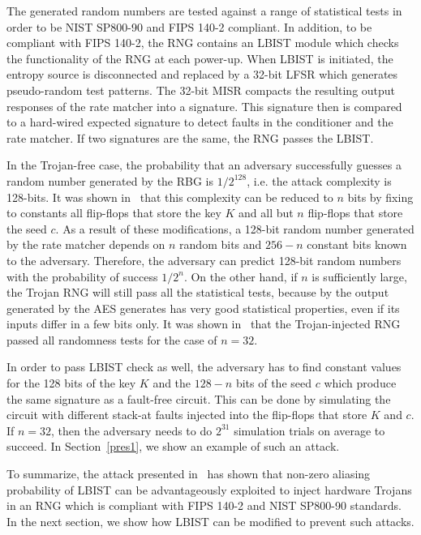 \documentclass[a4paper]{llncs}
\begin{document}
The generated random numbers are tested against a range of statistical tests in order to be NIST SP800-90 and FIPS 140-2 compliant.
In addition, to be compliant with FIPS 140-2, the RNG contains an LBIST module which checks the functionality of the RNG at each power-up. When LBIST is initiated, the entropy source is disconnected and replaced by a 32-bit LFSR which generates pseudo-random test patterns. The 32-bit MISR compacts the resulting output responses of the rate matcher into a signature.
This signature then is compared to a hard-wired expected signature to detect faults in the conditioner and the rate matcher. If two signatures are the same, the RNG passes the LBIST.



In the Trojan-free case, the probability that an adversary successfully guesses a random
number generated by the RBG is $1/2^{128}$, i.e. the attack complexity is 128-bits. 
It was shown in~\cite{BeRPB13} that this complexity can be reduced to $n$ bits by
fixing to constants all flip-flops that store the key $K$ and all but $n$
flip-flops that store the seed $c$. As a result of these modifications, a 128-bit random number generated by the rate matcher
depends on $n$ random bits and $256-n$ constant bits known to the adversary.
Therefore, the adversary can predict 128-bit random numbers with the
probability of success $1/2^n$. On the other hand, if $n$ is sufficiently large, the Trojan RNG will still pass all the statistical tests, because by the output generated by the AES generates has very good statistical properties, even if its inputs differ in a few bits only. It was shown in~\cite{BeRPB13} that the Trojan-injected RNG passed all randomness tests for the case of $n = 32$. 

In order to pass LBIST check as well, the adversary has to find constant values for the 128 bits of the key $K$ and the $128-n$ bits of the seed $c$ which produce the same signature as a fault-free circuit. This can be done by simulating the circuit with different stack-at faults injected into the flip-flops that store $K$ and $c$. If $n = 32$, then the adversary needs to do $2^{31}$ simulation trials on average to succeed. In Section~\ref{pres1}, we show an example of such an attack. 

To summarize, the attack presented in~\cite{BeRPB13} has shown that non-zero aliasing probability of LBIST can be advantageously exploited to inject hardware Trojans in an RNG which is compliant with FIPS 140-2 and NIST SP800-90 standards. In the next section, we show how LBIST can be modified to prevent such attacks. 
\end{document}
